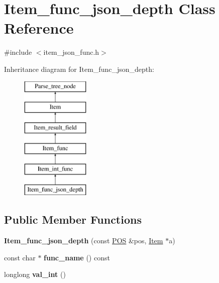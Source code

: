 \hypertarget{classItem__func__json__depth}{}\section{Item\+\_\+func\+\_\+json\+\_\+depth Class Reference}
\label{classItem__func__json__depth}


{\ttfamily \#include $<$item\+\_\+json\+\_\+func.\+h$>$}

Inheritance diagram for Item\+\_\+func\+\_\+json\+\_\+depth\+:\begin{figure}[H]
\begin{center}
\leavevmode
\includegraphics[height=6.000000cm]{classItem__func__json__depth}
\end{center}
\end{figure}
\subsection*{Public Member Functions}
\begin{DoxyCompactItemize}
\item 
\mbox{\label{classItem__func__json__depth_af77bf003ca4cc85b661a880207227cb3}} 
{\bfseries Item\+\_\+func\+\_\+json\+\_\+depth} (const \mbox{\hyperlink{structYYLTYPE}{P\+OS}} \&pos, \mbox{\hyperlink{classItem}{Item}} $\ast$a)
\item 
\mbox{\label{classItem__func__json__depth_a6c7e47b6bdc1905faa3aa9181b52aeda}} 
const char $\ast$ {\bfseries func\+\_\+name} () const
\item 
\mbox{\label{classItem__func__json__depth_a711e3c4fa03f6c909b85deb52638f132}} 
longlong {\bfseries val\+\_\+int} ()
\end{DoxyCompactItemize}
